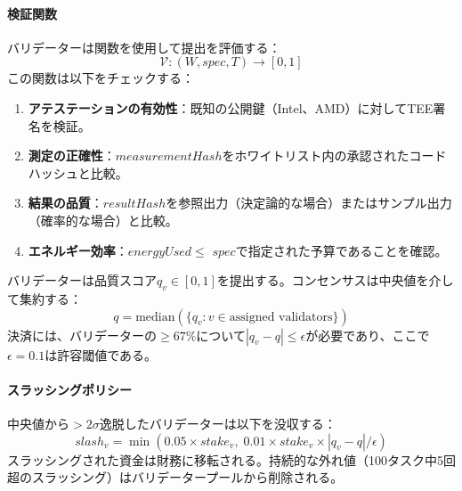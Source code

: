 \documentclass[11pt]{article}
\begin{document}
\paragraph{検証関数} バリデーターは関数を使用して提出を評価する：
\begin{equation}
\mathcal{V}: (W, spec, T) \rightarrow [0, 1]
\end{equation}
この関数は以下をチェックする：
\begin{enumerate}[noitemsep]
  \item \textbf{アテステーションの有効性}：既知の公開鍵（Intel、AMD）に対してTEE署名を検証。
  \item \textbf{測定の正確性}：$measurementHash$をホワイトリスト内の承認されたコードハッシュと比較。
  \item \textbf{結果の品質}：$resultHash$を参照出力（決定論的な場合）またはサンプル出力（確率的な場合）と比較。
  \item \textbf{エネルギー効率}：$energyUsed \leq$ $spec$で指定された予算であることを確認。
\end{enumerate}
バリデーターは品質スコア$q_v \in [0,1]$を提出する。コンセンサスは中央値を介して集約する：
\begin{equation}
q = \text{median}(\{q_v : v \in \text{assigned validators}\})
\end{equation}
決済には、バリデーターの$\geq 67\%$について$|q_v - q| \leq \epsilon$が必要であり、ここで$\epsilon = 0.1$は許容閾値である。

\paragraph{スラッシングポリシー} 中央値から$>2\sigma$逸脱したバリデーターは以下を没収する：
\begin{equation}
slash_v = \min(0.05 \times stake_v, \; 0.01 \times stake_v \times |q_v - q| / \epsilon)
\end{equation}
スラッシングされた資金は財務に移転される。持続的な外れ値（100タスク中5回超のスラッシング）はバリデータープールから削除される。
\end{document}
